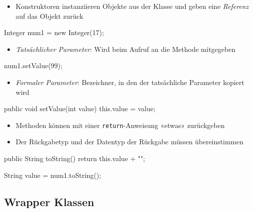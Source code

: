 \documentclass[a4paper,10pt, dvipsnames]{report}
\newcommand{\javaInLine}[1]{\texttt{#1}}
\begin{document}
\begin{itemize}
    \item Konstruktoren instanziieren Objekte aus der Klasse und geben eine \textit{Referenz} auf das Objekt zurück
\end{itemize}

\begin{javacodebox}
Integer num1 = new Integer(17);
\end{javacodebox}

\begin{itemize}
    \item \textit{Tatsächlicher Parameter}: Wird beim Aufruf an die Methode mitgegeben
\end{itemize}

\begin{javacodebox}
num1.setValue(99);
\end{javacodebox}

\begin{itemize}
    \item \textit{Formaler Parameter}: Bezeichner, in den der tatsächliche Parameter kopiert wird
\end{itemize}

\begin{javacodebox}
public void setValue(int value) {
    this.value = value;
}
\end{javacodebox}

\begin{itemize}
    \item Methoden können mit einer \javaInLine{return}-Anweisung «etwas» zurückgeben
    \item Der Rückgabetyp und der Datentyp der Rückgabe müssen übereinstimmen
\end{itemize}

\begin{javacodebox}
public String toString() {
    return this.value + "";
}
\end{javacodebox}

\begin{javacodebox}
String value = num1.toString();
\end{javacodebox}

\subsection{Wrapper Klassen}
\end{document}
